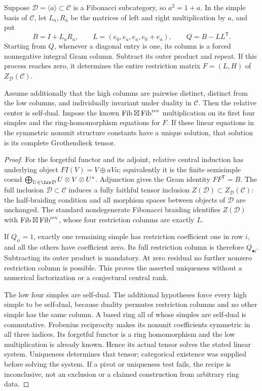 \begin{proposition}\label{prop:relative-reconstruction}
Suppose $\mathcal D=\langle a\rangle\subset\mathcal C$ is a Fibonacci
subcategory, so $a^2=1+a$. In the simple basis of $\mathcal C$, let $L_a,R_a$
be the matrices of left and right multiplication by $a$, and put
\[
 B=I+L_aR_a,\qquad
 L=(e_0,e_a,e_a,e_0+e_a),\qquad Q=B-LL^{\mathsf T}.
\]
Starting from $Q$, whenever a diagonal entry is one, its column is a
forced nonnegative integral Gram column. Subtract its outer product and
repeat. If this process reaches zero, it determines the entire restriction
matrix $F=(L,H)$ of $Z_{\mathcal D}(\mathcal C)$.

Assume additionally that the high columns are pairwise distinct, distinct
from the low columns, and individually invariant under duality in
$\mathcal C$. Then the relative center is self-dual. Impose the known
$\mathrm{Fib}\boxtimes\mathrm{Fib}^{\rm rev}$ multiplication on its first
four simples and the ring-homomorphism equations for $F$. If these linear
equations in the symmetric nonunit structure constants have a unique
solution, that solution is its complete Grothendieck tensor.
\end{proposition}
\begin{proof}
For the forgetful functor and its adjoint, relative central induction has
underlying object $FI(V)=V\oplus aVa$; equivalently it is the finite
semisimple coend $\bigoplus_{U\in\Irr\mathcal D}U\otimes V\otimes U^*$.
Adjunction gives the Gram identity $FF^{\mathsf T}=B$.
The full inclusion $\mathcal D\subset\mathcal C$ induces a fully faithful
tensor inclusion $Z(\mathcal D)\subset Z_{\mathcal D}(\mathcal C)$:
the half-braiding condition and all morphism spaces between objects of
$\mathcal D$ are unchanged. The standard nondegenerate Fibonacci braiding
identifies $Z(\mathcal D)$ with
$\mathrm{Fib}\boxtimes\mathrm{Fib}^{\rm rev}$, whose four restriction
columns are exactly $L$.

If $Q_{ii}=1$, exactly one remaining simple has restriction coefficient
one in row $i$, and all the others have coefficient zero. Its full
restriction column is therefore $Q_{\bullet i}$. Subtracting its outer
product is mandatory. At zero residual no further nonzero restriction
column is possible. This proves the asserted uniqueness without a
numerical factorization or a conjectural central rank.

The low four simples are self-dual. The additional hypotheses force every
high simple to be self-dual, because duality permutes restriction columns
and no other simple has the same column. A based ring all of whose simples
are self-dual is commutative. Frobenius reciprocity makes its nonunit
coefficients symmetric in all three indices. Its forgetful functor is a
ring homomorphism and the low multiplication is already known. Hence its
actual tensor solves the stated linear system. Uniqueness determines
that tensor; categorical existence was supplied before solving the
system. If a pivot or uniqueness test fails, the recipe is inconclusive,
not an exclusion or a claimed construction from arbitrary ring data.
\end{proof}

